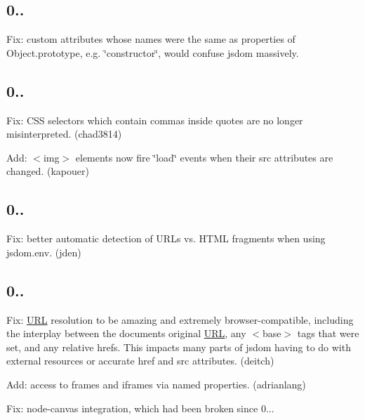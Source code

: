\subsection*{0..}


\begin{DoxyItemize}
\item Fix\+: custom attributes whose names were the same as properties of {\ttfamily Object.\+prototype}, e.\+g. {\ttfamily \char`\"{}constructor\char`\"{}}, would confuse jsdom massively.
\end{DoxyItemize}

\subsection*{0..}


\begin{DoxyItemize}
\item Fix\+: C\+SS selectors which contain commas inside quotes are no longer misinterpreted. (chad3814)
\item Add\+: {\ttfamily $<$img$>$} elements now fire {\ttfamily \char`\"{}load\char`\"{}} events when their {\ttfamily src} attributes are changed. (kapouer)
\end{DoxyItemize}

\subsection*{0..}


\begin{DoxyItemize}
\item Fix\+: better automatic detection of U\+R\+Ls vs. H\+T\+ML fragments when using {\ttfamily jsdom.\+env}. (jden)
\end{DoxyItemize}

\subsection*{0..}


\begin{DoxyItemize}
\item Fix\+: \mbox{\hyperlink{namespace_u_r_l}{U\+RL}} resolution to be amazing and extremely browser-\/compatible, including the interplay between the document\textquotesingle{}s original \mbox{\hyperlink{namespace_u_r_l}{U\+RL}}, any {\ttfamily $<$base$>$} tags that were set, and any relative {\ttfamily href}s. This impacts many parts of jsdom having to do with external resources or accurate {\ttfamily href} and {\ttfamily src} attributes. (deitch)
\item Add\+: access to frames and iframes via named properties. (adrianlang)
\item Fix\+: node-\/canvas integration, which had been broken since 0...
\end{DoxyItemize}

